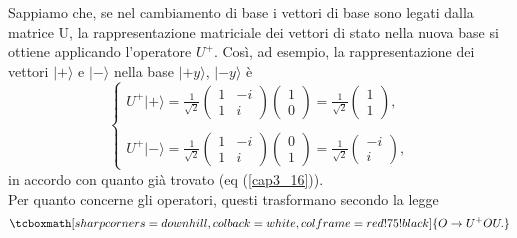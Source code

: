 \documentclass[a4paper,12pt,oneside]{book}
\begin{document}
Sappiamo che, se nel cambiamento di base i vettori di base sono legati dalla matrice U, la rappresentazione matriciale dei vettori di stato nella nuova base si ottiene applicando l'operatore $U^+$. Così, ad esempio, la rappresentazione dei vettori $| + \rangle $ e $| - \rangle $ nella base  $| +y \rangle $, $| -y \rangle $ è
	\begin{equation}
		\begin{cases}
		\displaystyle{U^+| + \rangle =\frac{1}{\sqrt{2}}
		\begin{pmatrix}
		1 & -i\\
		1 & i
		\end{pmatrix}
		\begin{pmatrix}
		1\\
		0
		\end{pmatrix}=
		\frac{1}{\sqrt{2}}
		\begin{pmatrix}
		1\\
		1
		\end{pmatrix} ,}\\
		\\
		\displaystyle{U^+| - \rangle =\frac{1}{\sqrt{2}}
		\begin{pmatrix}
		1 & -i\\
		1 & i
		\end{pmatrix}
		\begin{pmatrix}
		0\\
		1
		\end{pmatrix}=
		\frac{1}{\sqrt{2}}
		\begin{pmatrix}
		-i\\
		i
		\end{pmatrix} ,}
		\end{cases}
	\end{equation}
in accordo con quanto già trovato (eq (\ref{cap3_16})).\\

Per quanto concerne gli operatori, questi trasformano secondo la legge
	\begin{equation}
		\tcboxmath[sharp corners=downhill ,colback=white,colframe=red!75!black]{
			O \rightarrow U^+OU .
			}
	\end{equation}\\
	
\end{document}
